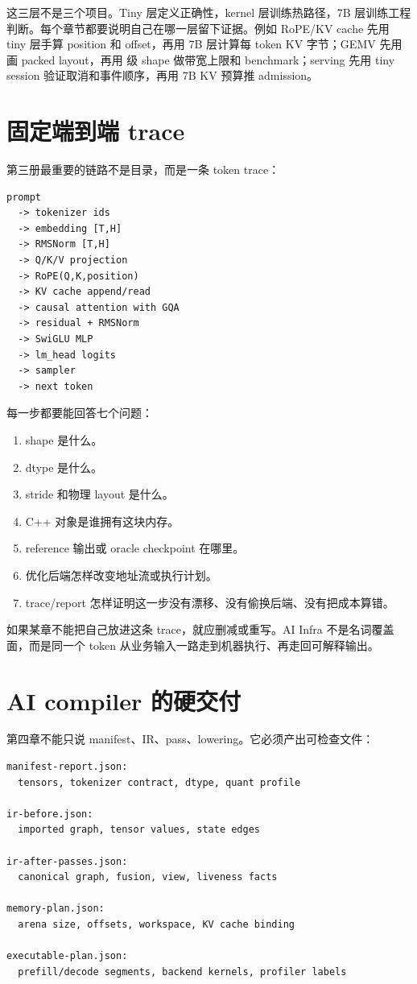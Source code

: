 这三层不是三个项目。Tiny 层定义正确性，kernel 层训练热路径，7B 层训练工程判断。每个章节都要说明自己在哪一层留下证据。例如 RoPE/KV cache 先用 tiny 层手算 position 和 offset，再用 7B 层计算每 token KV 字节；GEMV 先用  画 packed layout，再用  级 shape 做带宽上限和 benchmark；serving 先用 tiny session 验证取消和事件顺序，再用 7B KV 预算推 admission。

\section*{固定端到端 trace}

第三册最重要的链路不是目录，而是一条 token trace：

\begin{lstlisting}[numbers=none,caption={MiniLLM-CPU 固定端到端 trace}]
prompt
  -> tokenizer ids
  -> embedding [T,H]
  -> RMSNorm [T,H]
  -> Q/K/V projection
  -> RoPE(Q,K,position)
  -> KV cache append/read
  -> causal attention with GQA
  -> residual + RMSNorm
  -> SwiGLU MLP
  -> lm_head logits
  -> sampler
  -> next token
\end{lstlisting}

每一步都要能回答七个问题：

\begin{enumerate}
  \item shape 是什么。
  \item dtype 是什么。
  \item stride 和物理 layout 是什么。
  \item C++ 对象是谁拥有这块内存。
  \item reference 输出或 oracle checkpoint 在哪里。
  \item 优化后端怎样改变地址流或执行计划。
  \item trace/report 怎样证明这一步没有漂移、没有偷换后端、没有把成本算错。
\end{enumerate}

如果某章不能把自己放进这条 trace，就应删减或重写。AI Infra 不是名词覆盖面，而是同一个 token 从业务输入一路走到机器执行、再走回可解释输出。

\section*{AI compiler 的硬交付}

第四章不能只说 manifest、IR、pass、lowering。它必须产出可检查文件：

\begin{lstlisting}[numbers=none,caption={AI compiler 必须导出的 artifact}]
manifest-report.json:
  tensors, tokenizer contract, dtype, quant profile

ir-before.json:
  imported graph, tensor values, state edges

ir-after-passes.json:
  canonical graph, fusion, view, liveness facts

memory-plan.json:
  arena size, offsets, workspace, KV cache binding

executable-plan.json:
  prefill/decode segments, backend kernels, profiler labels
\end{lstlisting}

